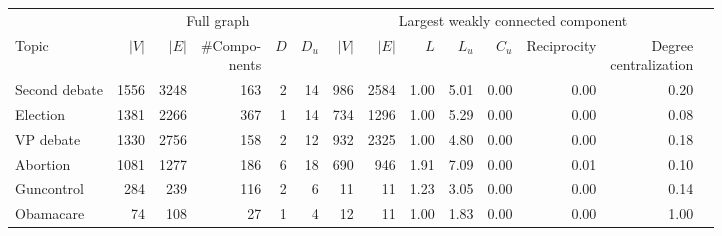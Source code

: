 \begin{tabular}{l|rrrrr|rrrrrrrr}
    \toprule
    \multicolumn{1}{c|}{} & \multicolumn{5}{c|}{Full graph} & \multicolumn{7}{c}{Largest weakly connected component} \\ 
               Topic &  $|V|$ &  $|E|$ & \makecell{\#Compo-\\nents} & $D$ &  $D_u$ &  $|V|$ &  $|E|$ &  $L$ &  $L_u$ &  $C_u$ &  Reciprocity &  \makecell{Degree\\ centralization} \\ 
    \midrule
        Second debate &   1556 &   3248 &                        163 &   2 &     14 &    986 &   2584 & 1.00 &   5.01 &   0.00 &         0.00 &                                0.20 \\
      Election &   1381 &   2266 &                        367 &   1 &     14 &    734 &   1296 & 1.00 &   5.29 &   0.00 &         0.00 &                                0.08 \\
            VP debate &   1330 &   2756 &                        158 &   2 &     12 &    932 &   2325 & 1.00 &   4.80 &   0.00 &         0.00 &                                0.18 \\
      Abortion &   1081 &   1277 &                        186 &   6 &     18 &    690 &    946 & 1.91 &   7.09 &   0.00 &         0.01 &                                0.10 \\
    Guncontrol &    284 &    239 &                        116 &   2 &      6 &     11 &     11 & 1.23 &   3.05 &   0.00 &         0.00 &                                0.14 \\
         Obamacare &     74 &    108 &                         27 &   1 &      4 &     12 &     11 & 1.00 &   1.83 &   0.00 &         0.00 &                                1.00 \\
    \bottomrule
\end{tabular}